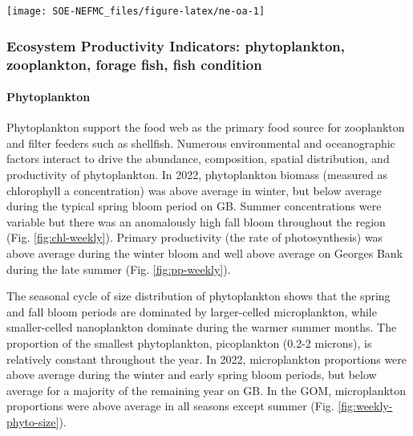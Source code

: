 \documentclass[
  10pt,
]{article}
\let\origfigure\figure
\let\endorigfigure\endfigure
\renewenvironment{figure}[1][2] {
    \expandafter\origfigure\expandafter[H]
} {
    \endorigfigure
}
\begin{document}
\begin{figure}

{\centering \texttt{[image: SOE-NEFMC\_files/figure-latex/ne-oa-1]} 

}

\caption{Left panel: Bottom aragonite saturation state ($\Omega_{Arag}$; summer only: June-August) on the U.S. Northeast Shelf based on quality-controlled vessel- and glider-based datasets from 2007-present. Right panel: Locations where summer bottom $\Omega_{Arag}$ were at or below the laboratory-derived sensitivity level for Atlantic cod (top panel) and American lobster (bottom). Gray circles indicate locations where carbonate chemistry samples were collected, but bottom $\Omega_{Arag}$ values were higher than sensitivity values determined for that species.}\label{fig:ne-oa}
\end{figure}

\hypertarget{ecosystem-productivity-indicators-phytoplankton-zooplankton-forage-fish-fish-condition}{%
\subsubsection{Ecosystem Productivity Indicators: phytoplankton, zooplankton, forage fish, fish condition}\label{ecosystem-productivity-indicators-phytoplankton-zooplankton-forage-fish-fish-condition}}

\hypertarget{phytoplankton}{%
\paragraph{Phytoplankton}\label{phytoplankton}}

Phytoplankton support the food web as the primary food source for zooplankton and filter feeders such as shellfish. Numerous environmental and oceanographic factors interact to drive the abundance, composition, spatial distribution, and productivity of phytoplankton. In 2022, phytoplankton biomass (measured as chlorophyll a concentration) was above average in winter, but below average during the typical spring bloom period on GB. Summer concentrations were variable but there was an anomalously high fall bloom throughout the region (Fig. \ref{fig:chl-weekly}). Primary productivity (the rate of photosynthesis) was above average during the winter bloom and well above average on Georges Bank during the late summer (Fig. \ref{fig:pp-weekly}).

The seasonal cycle of size distribution of phytoplankton shows that the spring and fall bloom periods are dominated by larger-celled microplankton, while smaller-celled nanoplankton dominate during the warmer summer months. The proportion of the smallest phytoplankton, picoplankton (0.2-2 microns), is relatively constant throughout the year. In 2022, microplankton proportions were above average during the winter and early spring bloom periods, but below average for a majority of the remaining year on GB. In the GOM, microplankton proportions were above average in all seasons except summer (Fig. \ref{fig:weekly-phyto-size}).
\end{document}
